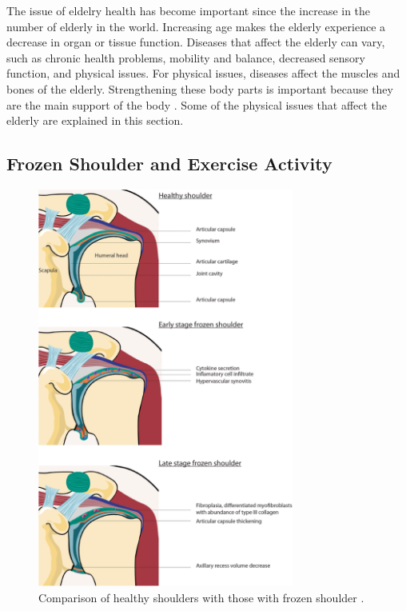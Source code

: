 The issue of eldelry health has become important since the increase in the number of elderly in the world. Increasing age makes the elderly experience a decrease in organ or tissue function. Diseases that affect the elderly can vary, such as chronic health problems, mobility and balance, decreased sensory function, and physical issues. For physical issues, diseases affect the muscles and bones of the elderly. Strengthening these body parts is important because they are the main support of the body \cite{PhysicalIssue}. Some of the physical issues that affect the elderly are explained in this section.

\subsection{Frozen Shoulder and Exercise Activity}
\label{subsec2:FrozenShoulder}

\begin{figure}[h!]
    \centering
    \includegraphics[width=0.75\textwidth]{bab2/ar_FrozenShoulder.png}
    \caption{Comparison of healthy shoulders with those with frozen shoulder \cite{FrozShoulder4}.}
    \label{fig:FrozenShoulder}
\end{figure}

